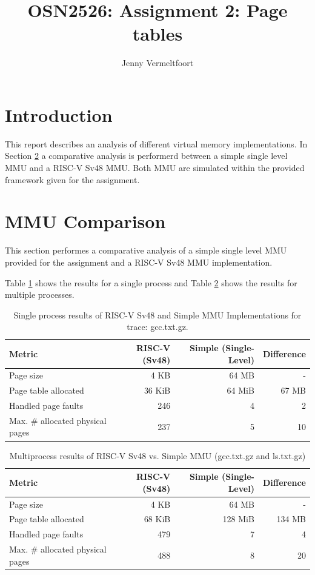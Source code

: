 \documentclass[a4paper,reqno,10pt]{article}
\numberwithin{equation}{subsection}
\theoremstyle{plain}
\theoremstyle{definition}
\begin{document}
\title{OSN2526: Assignment 2: Page tables}
\author{Jenny Vermeltfoort}

\maketitle

\section{Introduction}
This report describes an analysis of different virtual memory implementations. In Section \ref{sec:task1} a comparative analysis is performerd between a simple single level MMU and a RISC-V Sv48 MMU. Both MMU are simulated within the provided framework given for the assignment. 


\section{MMU Comparison}
\label{sec:task1}
This section performes a comparative analysis of a simple single level MMU provided for the assignment and a RISC-V Sv48 MMU implementation.

Table \ref{tab:mmu_comparison} shows the results for a single process and Table \ref{tab:mmu_comparison_updated} shows the results for multiple processes.

\begin{table}[h]
\centering
\caption{Single process results of RISC-V Sv48 and Simple MMU Implementations for trace: gcc.txt.gz.}
\label{tab:mmu_comparison}
    \begin{tabular}{lrrr}
        \toprule
        Metric & RISC-V (Sv48) & Simple (Single-Level) & Difference \\ \midrule
        Page size & 4 KB & 64 MB & - \\
        Page table allocated & 36 KiB & 64 MiB & 67 MB \\
        Handled page faults & 246 & 4 & 2 \\
        Max. \# allocated physical pages & 237 & 5 & 10 \\
    \end{tabular}
\end{table}

\begin{table}[h]
\centering
\caption{Multiprocess results of RISC-V Sv48 vs. Simple MMU (gcc.txt.gz and ls.txt.gz)}
\label{tab:mmu_comparison_updated}
    \begin{tabular}{lrrr}
    \toprule
    Metric & RISC-V (Sv48) & Simple (Single-Level) & Difference \\ \midrule
    Page size & 4 KB & 64 MB & - \\
    Page table allocated & 68 KiB & 128 MiB &  134 MB \\
    Handled page faults & 479 & 7 & 4 \\
    Max. \# allocated physical pages & 488 & 8 & 20 \\
    \end{tabular}
\end{table}
\end{document}
